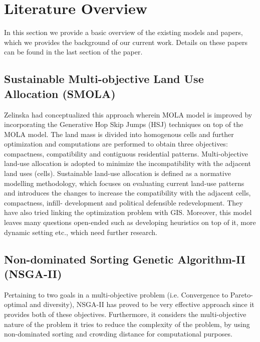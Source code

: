 \documentclass[12pt]{article} %
\begin{document}
\section{Literature Overview}
In this section we provide a basic overview of the existing models and papers, which we provides the background of our current work. Details on these papers can be found in the last section of the paper. \\
\subsection{Sustainable Multi-objective Land Use Allocation (SMOLA)}  Zelinska had conceptualized this approach wherein MOLA model is improved by incorporating the Generative Hop Skip Jumps (HSJ) techniques on top of the MOLA model. The land mass is divided into homogenous cells and further optimization and computations are performed to obtain three objectives: compactness, compatibility and contiguous residential patterns. Multi-objective land-use allocation is adopted to minimize the incompatibility with the adjacent land uses (cells). Sustainable land-use allocation is defined as a normative modelling methodology, which focuses on evaluating current land-use patterns and introduces the changes to increase the compatibility with the adjacent cells, compactness, infill- development and political defensible redevelopment. They have also tried linking the optimization problem with GIS. Moreover, this model leaves many questions open-ended such as developing heuristics on top of it, more dynamic setting etc., which need further research. \\

\subsection{Non-dominated Sorting Genetic Algorithm-II (NSGA-II)} Pertaining to two goals in a multi-objective problem (i.e. Convergence to Pareto-optimal and diversity), NSGA-II has proved to be very effective approach since it provides both of these objectives. Furthermore, it considers the multi-objective nature of the problem it tries to reduce the complexity of the problem, by using non-dominated sorting and crowding distance for computational purposes.\\
\end{document}
